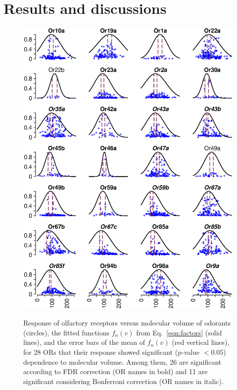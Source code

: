 \documentclass[11pt]{paper} %
\newcommand{\numberofreceptors}{ 28 }
\newcommand{\bonferroni}{ 11 }
\newcommand{\fdr}{ 26 }
\begin{document}
\section*{Results and discussions}
\begin{figure}
	\centering
		\includegraphics[width=0.8 \textwidth]{vol-res-}
		\label{fig:vol-res:all}		
	\caption{Response of olfactory receptors  versus molecular volume of odorants (circles),  
			the fitted functions $f_n(v)$ from Eq.~\ref{eqn:factors} (solid lines), 
			and the error bars of the mean of $f_n(v)$ (red vertical lines), 
			for \numberofreceptors ORs that their response showed significant (p-value $<0.05$) dependence to molecular volume. 
			Among them, \fdr are significant according to FDR correction (OR names in bold) and 
			\bonferroni are significant considering Bonferroni correction (OR names in italic).
		}
	\label{fig:vol-res}
\end{figure}
\end{document}
